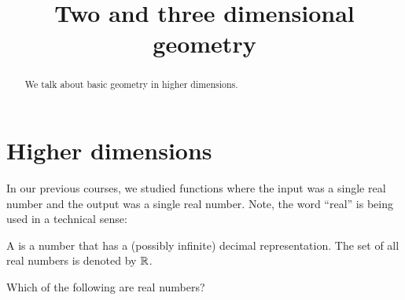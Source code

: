 \documentclass{ximera}
\title[Dig-In:]{Two and three dimensional geometry}
\begin{document}
\begin{abstract}
  We talk about basic geometry in higher dimensions.
\end{abstract}
\maketitle

\section{Higher dimensions}

In our previous courses, we studied functions where the input was a
single real number and the output was a single real number. Note, the
word ``real'' is being used in a technical sense:

\begin{definition}
  A  is a number that has a (possibly infinite)
  decimal representation. The set of all real numbers is denoted by
  $\mathbb R$.
\end{definition}
\begin{question}
  Which of the following are real numbers?
  \begin{selectAll}
    \choice[correct]{$\pi$}
    \choice{$\infty$}
  \end{selectAll}
\end{question}
\end{document}
